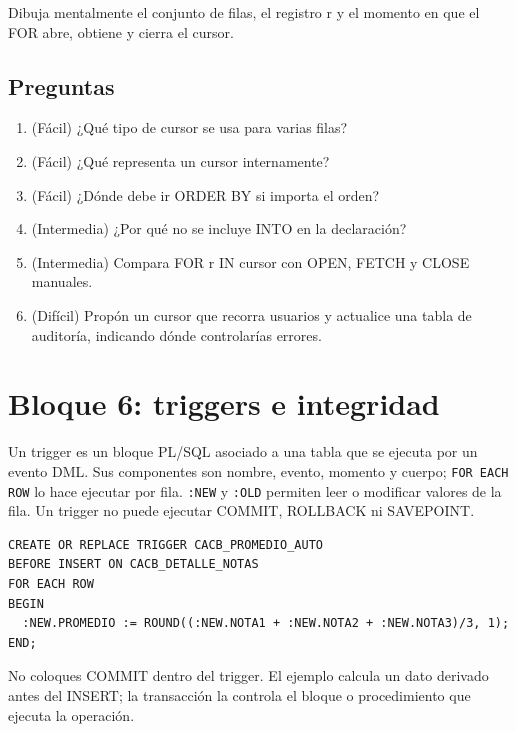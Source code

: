 \documentclass[11pt,a4paper]{article}
\newif\ifmostrarSoluciones
\newcommand{\campo}[1]{\texttt{#1}}
\begin{document}
\begin{pausa}Dibuja mentalmente el conjunto de filas, el registro r y el momento en que el FOR abre, obtiene y cierra el cursor.\end{pausa}
\subsection{Preguntas}
\begin{enumerate}[leftmargin=*]
\item (Fácil) ¿Qué tipo de cursor se usa para varias filas?
\item (Fácil) ¿Qué representa un cursor internamente?
\item (Fácil) ¿Dónde debe ir ORDER BY si importa el orden?
\item (Intermedia) ¿Por qué no se incluye INTO en la declaración?
\item (Intermedia) Compara FOR r IN cursor con OPEN, FETCH y CLOSE manuales.
\item (Difícil) Propón un cursor que recorra usuarios y actualice una tabla de auditoría, indicando dónde controlarías errores.
\end{enumerate}
\ifmostrarSoluciones\begin{clave}\textbf{Pauta breve:} el cursor explícito maneja varias filas. Es un segmento de memoria asociado al resultado. INTO pertenece a la obtención de una fila, no a la declaración. FOR gestiona automáticamente apertura, FETCH y cierre.\end{clave}\fi

\section{Bloque 6: triggers e integridad}
Un trigger es un bloque PL/SQL asociado a una tabla que se ejecuta por un evento DML. Sus componentes
son nombre, evento, momento y cuerpo; \campo{FOR EACH ROW} lo hace ejecutar por fila. \campo{:NEW}
y \campo{:OLD} permiten leer o modificar valores de la fila. Un trigger no puede ejecutar COMMIT,
ROLLBACK ni SAVEPOINT.

\begin{lstlisting}
CREATE OR REPLACE TRIGGER CACB_PROMEDIO_AUTO
BEFORE INSERT ON CACB_DETALLE_NOTAS
FOR EACH ROW
BEGIN
  :NEW.PROMEDIO := ROUND((:NEW.NOTA1 + :NEW.NOTA2 + :NEW.NOTA3)/3, 1);
END;
\end{lstlisting}

\begin{errorbox}No coloques COMMIT dentro del trigger. El ejemplo calcula un dato derivado antes del INSERT; la transacción la controla el bloque o procedimiento que ejecuta la operación.\end{errorbox}
\end{document}
